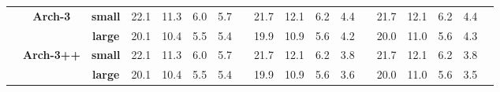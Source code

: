 \documentclass[10pt, review=true,sigconf]{acmart}
\begin{document}
\begin{table}[htbp]
{{\begin{tabular}{ccc||rrrrr|rrrrr|rrrrr}
&\multirow{2}{*}{\textbf{Arch-3}}  & \textbf{small}  & 22.1  &11.3    &6.0    &5.7    &       & 21.7  & 12.1  & 6.2  & 4.4      &       & 21.7  & 12.1  & 6.2 & 4.4      &      \\
&& \textbf{large} & 20.1  & 10.4   & 5.5   &  5.4       &       & 19.9  & 10.9  & 5.6  & 4.2      &       & 20.0  & 11.0  & 5.6  & 4.3       &  \\  \cline{2-18}  

&\multirow{2}{*}{\textbf{Arch-3++}}  & \textbf{small}  & 22.1  &11.3    &6.0    &5.7    &       & 21.7  & 12.1  & 6.2  & 3.8      &       & 21.7  & 12.1  & 6.2 & 3.8      &      \\
&& \textbf{large} & 20.1  & 10.4   & 5.5   &  5.4       &       & 19.9  & 10.9  & 5.6  & 3.6      &       & 20.0  & 11.0  & 5.6  & 3.5       &  \\     

\hline 





\end{tabular}}}
\end{table}
\end{document}
